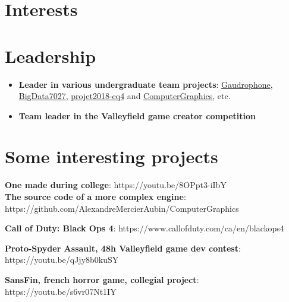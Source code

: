 \documentclass[10pt]{article} %
\begin{document}

\section{Interests}


\section{Leadership}
\begin{itemize}
\item \textbf{Leader in various undergraduate team projects}: \href{https://github.com/AlexandreMercierAubin/Gaudrophone}{Gaudrophone}, \href{https://github.com/AlexandreMercierAubin/BigData7027}{BigData7027}, \href{https://github.com/AlexandreMercierAubin/projet2018-eq4}{projet2018-eq4} and \href{https://github.com/AlexandreMercierAubin/ComputerGraphics}{ComputerGraphics}, etc. \\ 
\item \textbf{Team leader in the Valleyfield game creator competition}
\end{itemize}

\section{Some interesting projects}

{
\textbf{One made during college}: https://youtu.be/8OPpt3-iIbY\\
\textbf{The source code of a more complex engine}: https://github.com/AlexandreMercierAubin/ComputerGraphics\\

}

{
\textbf{Call of Duty: Black Ops 4}: https://www.callofduty.com/ca/en/blackops4

\textbf{Proto-Spyder Assault, 48h Valleyfield game dev contest}: https://youtu.be/qJjy8b0kuSY

\textbf{SansFin, french horror game, collegial project}: https://youtu.be/s6vr07Nt1IY
}
\end{document}
